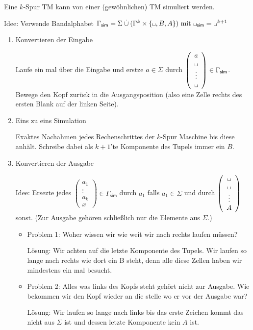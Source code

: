 \begin{Bemerkung}
Eine $k$-Spur \ac{TM} kann von einer (gewöhnlichen) \ac{TM} simuliert werden.

\medskip

Idee: Verwende Bandalphabet $\Gamma_\mathsf{sim} = \Sigma \overset{.}{\cup} (\Gamma^k\times\{\blank, B, A\})\text{ mit } \blank_\mathsf{sim}=\blank^{k+1}$

\begin{enumerate}
 \item Konvertieren der Eingabe
 
 Laufe ein mal über die Eingabe und erstze $a\in\Sigma$ durch $\left(\begin{array}{c}a\\ \mblank\\ \vdots\\ \mblank\end{array}\right)\in\Gamma_\mathsf{sim}$. 
 Bewege den Kopf zurück in die Ausgangsposition (also eine Zelle rechts des ersten Blank auf der linken Seite).
 
 \item Eins zu eins Simulation
 
 Exaktes Nachahmen jedes Rechenschrittes der $k$-Spur Maschine bis diese anhält.
 Schreibe dabei als $k+1$'te Komponente des Tupels immer ein $B$.
 
 \item Konvertieren der Ausgabe
 
 Idee: Ersezte jedes $\left(\begin{array}{c}a_1\\ \vdots\\ a_k\\ x\end{array}\right)\in\Gamma_\mathsf{sim}$ durch $a_1$ falls $a_1\in\Sigma$ und durch 
 $\left(\begin{array}{c}\mblank \\ \mblank\\ \vdots\\ A\end{array}\right)$ sonst.
 (Zur Ausgabe gehören schließlich nur die Elemente aus $\Sigma$.)
 
 \begin{itemize}
  \item Problem 1: Woher wissen wir wie weit wir nach rechts laufen müssen?
  
  Lösung: Wir achten auf die letzte Komponente des Tupels. 
  Wir laufen so lange nach rechts wie dort ein B steht, denn alle diese Zellen haben wir mindestens ein mal besucht.
  
  \item Problem 2: Alles was links des Kopfs steht gehört nicht zur Ausgabe. 
  Wie bekommen wir den Kopf wieder an die stelle wo er vor der Ausgabe war?
  
  Lösung: Wir laufen so lange nach links bis das erste Zeichen kommt das nicht aus $\Sigma$ ist und dessen letzte Komponente kein $A$ ist. 
 \end{itemize}
\end{enumerate}

\end{Bemerkung}


